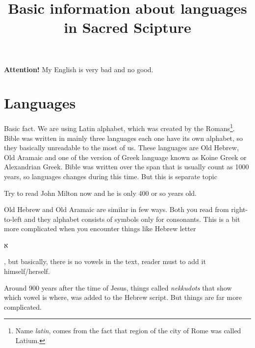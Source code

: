 \documentclass[a4paper,11pt]{article}
\title{Basic information about languages in Sacred Scipture}
\begin{document}





\maketitle %





\textbf{Attention!} My English is very bad and no good.










\section{Languages} %



Basic fact. We are using Latin alphabet, which was created by the
Romans\footnote{Name \textit{latin}, comes from the fact that region of the
  city of Rome was called Latium.}. Bible was written in mainly three
languages each one have its own alphabet, so they basically unreadable to
the most of us. These languages are Old Hebrew, Old Aramaic and one of the
version of Greek language known as Koine Greek or Alexandrian Greek. Bible
was written over the span that is usually count as 1000 years, so languages
changes during this time. But this is separate topic

Try to read John Milton now and he is only 400 or so years old.

Old Hebrew and Old Aramaic are similar in few ways. Both you read from
right-to-left and they alphabet consists of symbols only for consonants.
This is a bit more complicated when you encounter things like Hebrew letter
\begin{hebrew} א \end{hebrew}, but basically, there is no vowels in the
text, reader must to add it himself/herself.

Around 900 years after the time of Jesus, things called \textit{nekkudots}
that show which vowel is where, was added to the Hebrew script. But things
are far more complicated.
\end{document}
